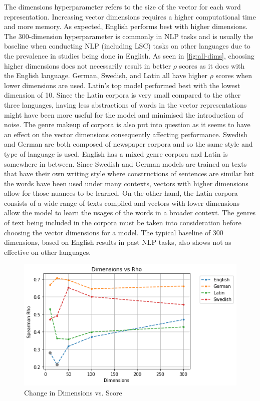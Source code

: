 The dimensions hyperparameter refers to the size of the vector for each word representation. Increasing vector dimensions requires a higher computational time and more memory. As expected, English performs best with higher dimensions. The 300-dimension hyperparameter is commonly in NLP tasks and is usually the baseline when conducting NLP (including LSC) tasks on other languages due to the prevalence in studies being done in English. As seen in \autoref{fig:all-dims}, choosing higher dimensions does not necessarily result in better $\rho$ scores as it does with the English language. German, Swedish, and Latin all have higher $\rho$ scores when lower dimensions are used. Latin’s top model performed best with the lowest dimension of 10. Since the Latin corpora is very small compared to the other three languages, having less abstractions of words in the vector representations might have been more useful for the model and minimised the introduction of noise. The genre makeup of corpora is also put into question as it seems to have an effect on the vector dimensions consequently affecting performance. Swedish and German are both composed of newspaper corpora and so the same style and type of language is used. English has a mixed genre corpora and Latin is somewhere in between. Since Swedish and German models are trained on texts that have their own writing style where constructions of sentences are similar but the words have been used under many contexts, vectors with higher dimensions allow for those nuances to be learned. On the other hand, the Latin corpora consists of a wide range of texts compiled and vectors with lower dimensions allow the model to learn the usages of the words in a broader context. The genres of text being included in the corpora must be taken into consideration before choosing the vector dimensions for a model. The typical baseline of 300 dimensions, based on English results in past NLP tasks, also shows not as effective on other languages.

\begin{figure}[h]
  \centering
  \includegraphics[width=.8\linewidth]{sections/figures/dims_all.png}
  \caption{Change in Dimensions vs. Score}
  \label{fig:all-dims}
\end{figure}

